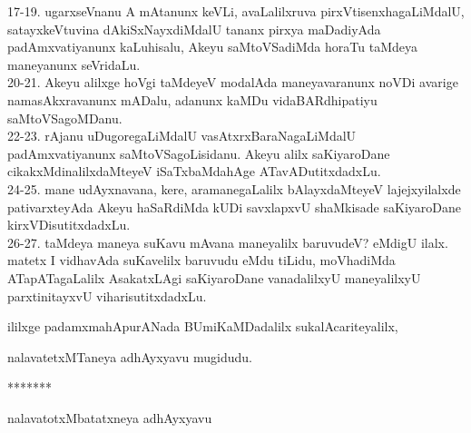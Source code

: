 \documentclass{article}
\begin{document}
17-19. ugarxseVnanu A mAtanunx keVLi, avaLalilxruva pirxVtisenxhagaLiMdalU, satayxkeVtuvina dAkiSxNayxdiMdalU tananx pirxya maDadiyAda padAmxvatiyanunx kaLuhisalu, Akeyu saMtoVSadiMda horaTu taMdeya maneyanunx seVridaLu.\\
20-21. Akeyu alilxge hoVgi taMdeyeV modalAda maneyavaranunx noVDi avarige namasAkxravanunx mADalu, adanunx kaMDu vidaBARdhipatiyu saMtoVSagoMDanu.\\
22-23. rAjanu uDugoregaLiMdalU vasAtxrxBaraNagaLiMdalU padAmxvatiyanunx saMtoVSagoLisidanu. Akeyu alilx saKiyaroDane cikakxMdinalilxdaMteyeV iSaTxbaMdahAge ATavADutitxdadxLu.\\
24-25. mane udAyxnavana, kere, aramanegaLalilx bAlayxdaMteyeV lajejxyilalxde pativarxteyAda Akeyu haSaRdiMda kUDi savxlapxvU shaMkisade saKiyaroDane kirxVDisutitxdadxLu.\\
26-27. taMdeya maneya suKavu mAvana maneyalilx baruvudeV? eMdigU ilalx. matetx I vidhavAda suKavelilx baruvudu eMdu tiLidu, moVhadiMda ATapATagaLalilx AsakatxLAgi saKiyaroDane vanadalilxyU maneyalilxyU parxtinitayxvU viharisutitxdadxLu.\\

\begin{center}
ililxge padamxmahApurANada BUmiKaMDadalilx sukalAcariteyalilx,
\end{center}

\begin{center}
nalavatetxMTaneya adhAyxyavu mugidudu.
\end{center}

\begin{center}
*******
\end{center}

\begin{center}
nalavatotxMbatatxneya adhAyxyavu
\end{center}
\end{document}
